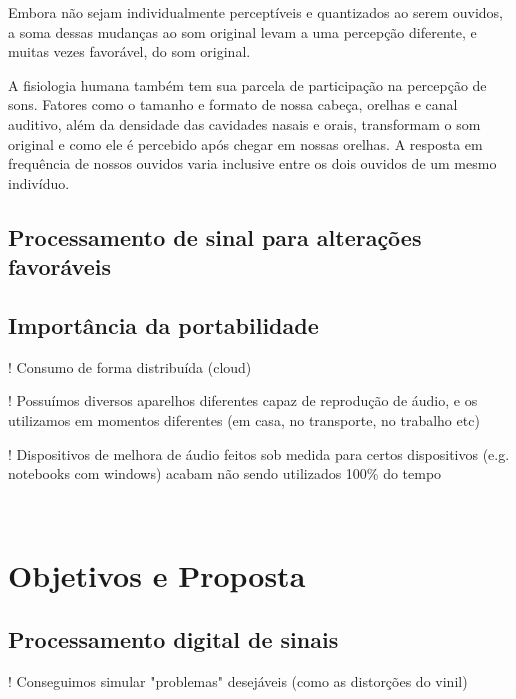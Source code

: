 Embora não sejam individualmente perceptíveis e quantizados ao serem ouvidos, a soma dessas mudanças ao som original levam a uma percepção diferente, e muitas vezes favorável, do som original.


A fisiologia humana também tem sua parcela de participação na percepção de sons. Fatores como o tamanho e formato de nossa cabeça, orelhas e canal auditivo, além da densidade das cavidades nasais e orais, transformam o som original e como ele é percebido após chegar em nossas orelhas.  A resposta em frequência de nossos ouvidos varia inclusive entre os dois ouvidos de um mesmo indivíduo.


\subsection{Processamento de sinal para alterações favoráveis}\label{subsec:processamentoSinalAlteracoesFavoraveis}
\subsection{Importância da portabilidade}\label{subsec:importanciaPortabilidade}

! Consumo de forma distribuída (cloud)

! Possuímos diversos aparelhos diferentes capaz de reprodução de áudio, e os utilizamos em momentos diferentes (em casa, no transporte, no trabalho etc)

! Dispositivos de melhora de áudio feitos sob medida para certos dispositivos (e.g. notebooks com windows) acabam não sendo utilizados 100\% do tempo

\

\section{Objetivos e Proposta}
\subsection{Processamento digital de sinais}
! Conseguimos simular "problemas" desejáveis (como as distorções do vinil)

